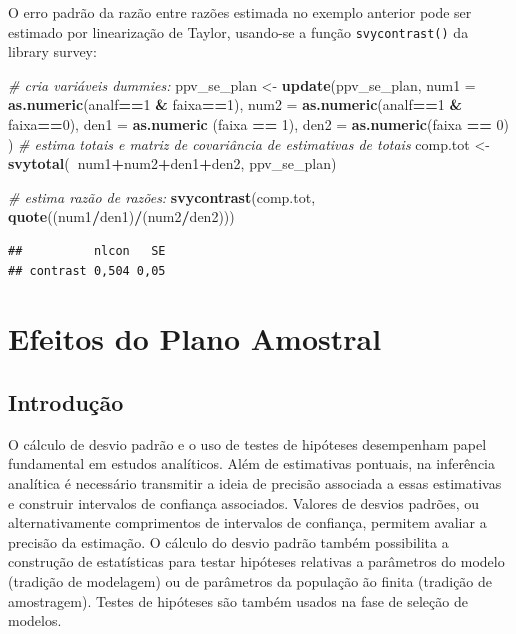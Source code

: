 \documentclass[]{book}
\newenvironment{Shaded}{\begin{snugshade}}{\end{snugshade}}
\newcommand{\KeywordTok}[1]{\textcolor[rgb]{0.13,0.29,0.53}{\textbf{#1}}}
\newcommand{\DataTypeTok}[1]{\textcolor[rgb]{0.13,0.29,0.53}{#1}}
\newcommand{\DecValTok}[1]{\textcolor[rgb]{0.00,0.00,0.81}{#1}}
\newcommand{\StringTok}[1]{\textcolor[rgb]{0.31,0.60,0.02}{#1}}
\newcommand{\CommentTok}[1]{\textcolor[rgb]{0.56,0.35,0.01}{\textit{#1}}}
\newcommand{\OperatorTok}[1]{\textcolor[rgb]{0.81,0.36,0.00}{\textbf{#1}}}
\newcommand{\NormalTok}[1]{#1}
\theoremstyle{definition}
\theoremstyle{definition}
\theoremstyle{definition}
\theoremstyle{remark}
\begin{document}
O erro padrão da razão entre razões estimada no exemplo anterior pode
ser estimado por linearização de Taylor, usando-se a função
\texttt{svycontrast()} da library survey:

\begin{Shaded}
\begin{Highlighting}[]
\CommentTok{# cria variáveis dummies: }
\NormalTok{ppv_se_plan <-}\StringTok{ }\KeywordTok{update}\NormalTok{(ppv_se_plan,}
\DataTypeTok{num1 =} \KeywordTok{as.numeric}\NormalTok{(analf}\OperatorTok{==}\DecValTok{1} \OperatorTok{&}\StringTok{ }\NormalTok{faixa}\OperatorTok{==}\DecValTok{1}\NormalTok{),}
\DataTypeTok{num2 =} \KeywordTok{as.numeric}\NormalTok{(analf}\OperatorTok{==}\DecValTok{1} \OperatorTok{&}\StringTok{ }\NormalTok{faixa}\OperatorTok{==}\DecValTok{0}\NormalTok{),}
\DataTypeTok{den1 =} \KeywordTok{as.numeric}\NormalTok{ (faixa }\OperatorTok{==}\StringTok{ }\DecValTok{1}\NormalTok{),}
\DataTypeTok{den2 =} \KeywordTok{as.numeric}\NormalTok{(faixa }\OperatorTok{==}\StringTok{ }\DecValTok{0}\NormalTok{)}
\NormalTok{)}
\CommentTok{# estima totais e matriz de covariância de estimativas de totais}
\NormalTok{comp.tot <-}\StringTok{ }\KeywordTok{svytotal}\NormalTok{(}\OperatorTok{~}\NormalTok{num1}\OperatorTok{+}\NormalTok{num2}\OperatorTok{+}\NormalTok{den1}\OperatorTok{+}\NormalTok{den2, ppv_se_plan)  }

\CommentTok{# estima razão de razões:  }
\KeywordTok{svycontrast}\NormalTok{(comp.tot, }\KeywordTok{quote}\NormalTok{((num1}\OperatorTok{/}\NormalTok{den1)}\OperatorTok{/}\NormalTok{(num2}\OperatorTok{/}\NormalTok{den2)))  }
\end{Highlighting}
\end{Shaded}

\begin{verbatim}
##          nlcon   SE
## contrast 0,504 0,05
\end{verbatim}

\chapter{Efeitos do Plano Amostral}\label{epa}

\section{Introdução}\label{introducao}

O cálculo de desvio padrão e o uso de testes de hipóteses desempenham
papel fundamental em estudos analíticos. Além de estimativas pontuais,
na inferência analítica é necessário transmitir a ideia de precisão
associada a essas estimativas e construir intervalos de confiança
associados. Valores de desvios padrões, ou alternativamente comprimentos
de intervalos de confiança, permitem avaliar a precisão da estimação. O
cálculo do desvio padrão também possibilita a construção de estatísticas
para testar hipóteses relativas a parâmetros do modelo (tradição de
modelagem) ou de parâmetros da população ão finita (tradição de
amostragem). Testes de hipóteses são também usados na fase de seleção de
modelos.
\end{document}
